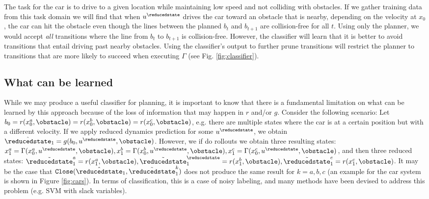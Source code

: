The task for the car is to drive to a given location while maintaining low speed and not colliding with obstacles. If we gather training data from this task domain we will find that when $u^\reducedstate$ drives the car toward an obstacle that is nearby, depending on the velocity at $x_0$, the car can hit the obstacle even though the lines between the planned $b_t$ and $b_{t+1}$ are collision-free for all $t$. Using only the planner, we would accept \textit{all} transitions where the line from $b_t$ to $b_{t+1}$ is collision-free. However, the classifier will learn that it is better to avoid transitions that entail driving past nearby obstacles. Using the classifier's output to further prune transitions will restrict the planner to transitions that are more likely to succeed when executing $\Gamma$ (see Fig. \ref{fig:classifier}).



\subsection{What can be learned}

While we may produce a useful classifier for planning, it is important to know that there is a fundamental limitation on what can be learned by this approach because of the loss of information that may happen in $r$ and/or $g$. Consider the following scenario: Let $b_0 = r(x_0^a,\obstacle) = r(x_0^b,\obstacle) = r(x_0^c,\obstacle)$, e.g. there are multiple states where the car is at a certain position but with a different velocity. If we apply reduced dynamics prediction for some $u^\reducedstate$, we obtain $\hat{\reducedstate}_1 = g(b_0,u^\reducedstate,\obstacle)$. However, we if do rollouts we obtain three resulting states: $x_1^a = \Gamma(x_0^a,u^\reducedstate,\obstacle), x_1^b = \Gamma(x_0^b,u^\reducedstate,\obstacle), x_1^c = \Gamma(x_0^c,u^\reducedstate,\obstacle)$, and then three reduced states: $\tilde{\reducedstate}_1^a = r(x_1^a,\obstacle),\tilde{\reducedstate}_1^\reducedstate = r(x_1^b,\obstacle), \tilde{\reducedstate}_1^c = r(x_1^c,\obstacle)$. It may be the case that $\texttt{Close}(\hat{\reducedstate}_1, \tilde{\reducedstate}_1^k)$ does not produce the same result for $k={a,b,c}$ (an example for the car system is shown in Figure \ref{fig:cars}). In terms of classification, this is a case of noisy labeling, and many methods have been devised to address this problem (e.g. SVM with slack variables). %

